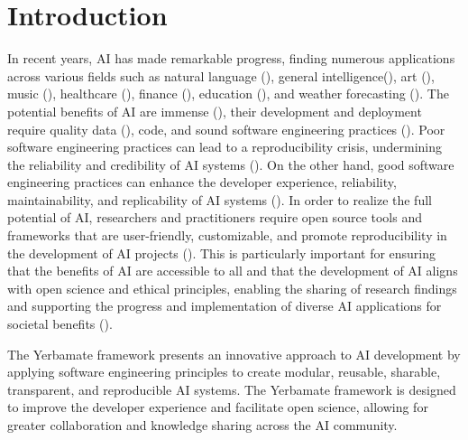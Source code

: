 
\section{Introduction}


 In recent years, AI has made remarkable progress, finding numerous applications across various fields such as natural language (\cite{gpt}), general intelligence(\cite{gato}), art (\cite{diffusion}), music (\cite{musiclm}), healthcare (\cite{aihealthcare}), finance (\cite{bao2022fraudartificial}), education (\cite{aieducation}), and weather forecasting (\cite{weather}). The potential benefits of AI are immense (\cite{beneficialai,potencialaibenefit}), their development and deployment require quality data (\cite{lecun2015deep}), code, and sound software engineering practices (\cite{se4dl,amershi2019software}). Poor software engineering practices can lead to a reproducibility crisis, undermining the reliability and credibility of AI systems (\cite{leakage-recrisis}). On the other hand, good software engineering practices can enhance the developer experience, reliability, maintainability, and replicability of AI systems (\cite{se4dl,amershi2019software, wan2019does}). In order to realize the full potential of AI, researchers and practitioners require open source tools and frameworks that are user-friendly, customizable, and promote reproducibility in the development of AI projects (\cite{lu2022softwareAIReponse,li2018can,wolf2020designing,olson2018system,ong2021guide,gundersen2018reproducible}). This is particularly important for ensuring that the benefits of AI are accessible to all and that the development of AI aligns with open science and ethical principles, enabling the sharing of research findings and supporting the progress and implementation of diverse AI applications for societal benefits (\cite{coro2020open,braun2018open, mittelstadt2016ethics,floridi2018ai4people,ong2021guide}).

The Yerbamate framework presents an innovative approach to AI development by applying software engineering principles to create modular, reusable, sharable, transparent, and reproducible AI systems. The Yerbamate framework is designed to improve the developer experience and facilitate open science, allowing for greater collaboration and knowledge sharing across the AI community.